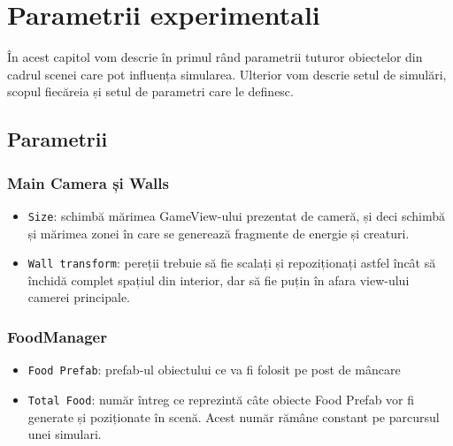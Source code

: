 \chapter{Parametrii experimentali}\label{SetariExperimentale}
În acest capitol vom descrie în primul rând parametrii tuturor obiectelor din cadrul scenei care pot influența simularea.
Ulterior vom descrie setul de simulări, scopul fiecăreia și setul de parametri care le definesc.
\section{Parametrii}
\subsection{Main Camera și Walls}
\begin{itemize}
\item \texttt{Size}: schimbă mărimea GameView-ului prezentat de cameră, și deci schimbă și mărimea zonei în care se generează fragmente de energie și creaturi.
\item \texttt{Wall transform}: pereții trebuie să fie scalați și repoziționați astfel încât să închidă complet spațiul din interior, dar să fie puțin în afara view-ului camerei principale.
\end{itemize}

\subsection{FoodManager}
\begin{itemize}
\item \texttt{Food Prefab}: prefab-ul obiectului ce va fi folosit pe post de mâncare
\item \texttt{Total Food}: număr întreg ce reprezintă câte obiecte Food Prefab vor fi generate și poziționate în scenă. Acest număr rămâne constant pe parcursul unei simulari.
\end{itemize}

